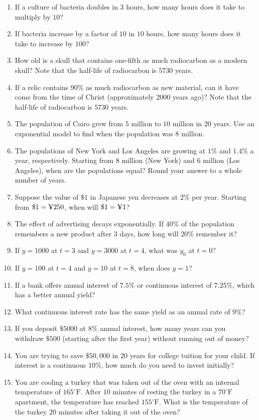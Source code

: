 \documentclass{exercises}
\begin{document}
\begin{enumerate}[resume]
\item If a culture of bacteria doubles in $3$ hours, how many hours does it take to multiply by $10$?
\item If bacteria increase by a factor of $10$ in $10$ hours, how many hours does it take to increase by $100$?
\item How old is a skull that contains one-fifth as much radiocarbon as a modern skull? Note that the half-life of radiocarbon is $5730$ years.
\item If a relic contains $90\%$ as much radiocarbon as new material, can it have come from the time of Christ (approximately $2000$ years ago)? Note that the half-life of radiocarbon is $5730$ years.
\item The population of Cairo grew from $5$ million to $10$ million in $20$ years. Use an exponential model to find when the population was $8$ million.
\item The populations of New York and Los Angeles are growing at $1\%$ and $1.4\%$ a year, respectively. Starting from $8$ million (New York) and $6$ million (Los Angeles), when are the populations equal? Round your answer to a whole number of years.
\item Suppose the value of $\$1$ in Japanese yen decreases at $2\%$ per year. Starting from $\$1=\text{\textyen}250$, when will $\$1=\text{\textyen}1$?
\item The effect of advertising decays exponentially. If $40\%$ of the population remembers a new product after $3$ days, how long will $20\%$ remember it?
\item If $y=1000$ at $t=3$ and $y=3000$ at $t=4$, what was $y_{0}$ at $t=0$?
\item If $y=100$ at $t=4$ and $y=10$ at $t=8$, when does $y=1$?
\item If a bank offers annual interest of $7.5\%$ or continuous interest of $7.25\%$, which has a better annual yield?
\item What continuous interest rate has the same yield as an annual rate of $9\%$?
\item If you deposit $\$5000$ at $8\%$ annual interest, how many years can you withdraw $\$500$ (starting after the first year) without running out of money?
\item You are trying to save $\$50{,}000$ in $20$ years for college tuition for your child. If interest is a continuous $10\%$, how much do you need to invest initially?
\item You are cooling a turkey that was taken out of the oven with an internal temperature of $165^\circ \text{F}$. After $10$ minutes of resting the turkey in a $70^\circ \text{F}$ apartment, the temperature has reached $155^\circ \text{F}$. What is the temperature of the turkey $20$ minutes after taking it out of the oven?

\end{enumerate}
\end{document}
